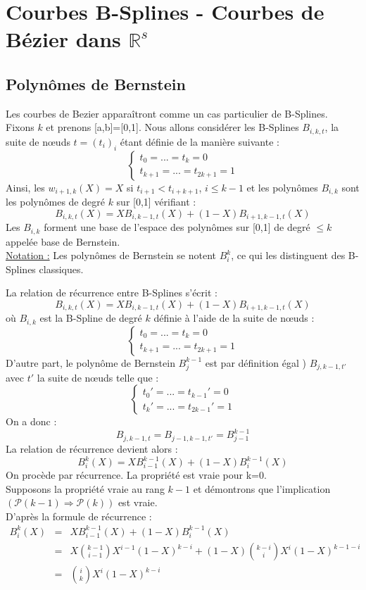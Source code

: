 \section{Courbes B-Splines - Courbes de Bézier dans $\mathbb{R}^s$}
\subsection{Polynômes de Bernstein}
Les courbes de Bezier apparaîtront comme un cas particulier de B-Splines.\\
Fixons $k$ et prenons [a,b]=[0,1]. Nous allons considérer les B-Splines $B_{i,k,t}$, la suite de n\oe uds $t=(t_i)_i$ étant définie de la manière suivante :
	\[\left\{ \begin{array}{c} t_0=...=t_k=0 \\ t_{k+1}=...=t_{2k+1}=1 \end{array}\right.\]
Ainsi, les $w_{i+1,k}(X)=X$ si $t_{i+1}<t_{i+k+1}$, $i\leq k-1$ et les polynômes $B_{i,k}$ sont les polynômes de degré $k$ sur [0,1] vérifiant :
	\[B_{i,k,t}(X)=XB_{i,k-1,t}(X)+(1-X)B_{i+1,k-1,t}(X)\]
Les $B_{i,k}$ forment une base de l'espace des polynômes sur [0,1] de degré $\leq k$ appelée base de Bernstein.\\
\underline{Notation :} Les polynômes de Bernstein se notent $B_i^k$, ce qui les distinguent des B-Splines classiques.


\begin{dem}
La relation de récurrence entre B-Splines s'écrit :
	\[B_{i,k,t}(X)=XB_{i,k-1,t}(X)+(1-X)B_{i+1,k-1,t}(X)\]
où $B_{i,k}$ est la B-Spline de degré $k$ définie à l'aide de la suite de n\oe uds : 
	\[\left\{ \begin{array}{c} t_0=...=t_k=0 \\ t_{k+1}=...=t_{2k+1}=1 \end{array}\right.\]
D'autre part, le polynôme de Bernstein $B_j^{k-1}$ est par définition égal ) $B_{j,k-1,t'}$ avec $t'$ la suite de n\oe uds telle que :
	\[\left\{ \begin{array}{c} t_0'=...=t_{k-1}'=0 \\ t_k'=...=t_{2k-1}'=1 \end{array}\right.\]
On a donc :
	\[B_{j,k-1,t}=B_{j-1,k-1,t'}=B_{j-1}^{k-1}\]
La relation de récurrence devient alors :
	\[B_i^k(X)=XB_{i-1}^{k-1}(X)+(1-X)B_i^{k-1}(X)\]
On procède par récurrence. La propriété est vraie pour k=0.\\
Supposons la propriété vraie au rang $k-1$ et démontrons que l'implication $(\mathcal{P}(k-1)\Rightarrow \mathcal{P}(k))$ est vraie.\\
D'après la formule de récurrence :
\begin{eqnarray*}
	B_i^k(X)&=&XB_{i-1}^{k-1}(X)+(1-X)B_i^{k-1}(X)\\
		&=&X\binom{k-1}{i-1}X^{i-1}(1-X)^{k-i}+(1-X)\binom{k-i}{i}X^i(1-X)^{k-1-i}\\
		&=&\binom{i}{k}X^i(1-X)^{k-i}
\end{eqnarray*}
\end{dem}

